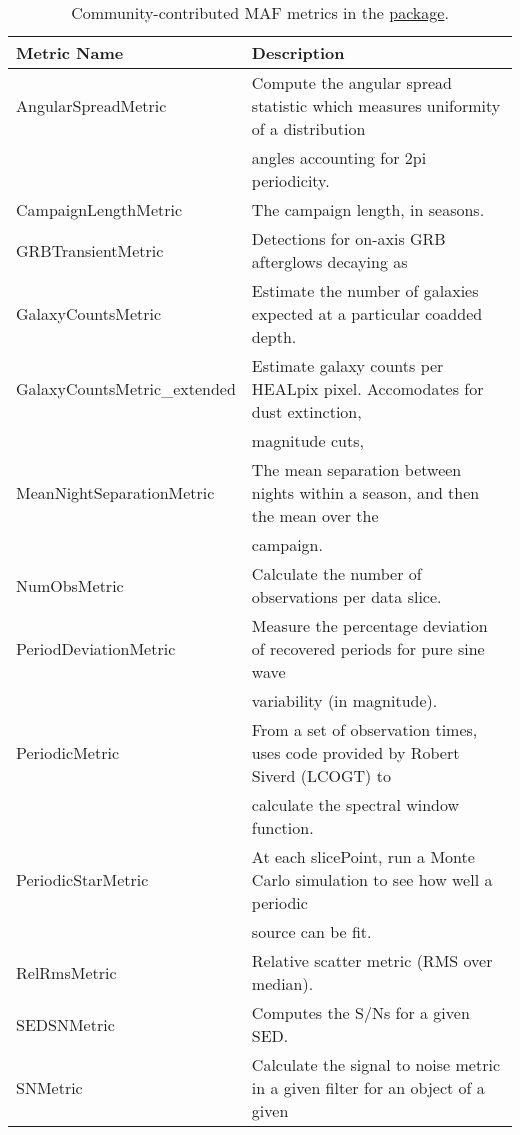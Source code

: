 \begin{table}[!t]
\scriptsize
\setcounter{table}{1}
\makeatletter
\renewcommand{\thetable}{A.\arabic{table}}
\caption{Community-contributed MAF metrics in the \href{https://github.com/LSST-nonproject/sims\_maf\_contrib/tree/master/mafContrib}{  package}.\label{tab:contrib_metrics}}
\medskip
\begin{tabular}{ll}
\hline
                 Metric Name &                                                                       Description \\
\hline\hline
 AngularSpreadMetric &  Compute the angular spread statistic which measures uniformity of a distribution \\
  &  angles accounting for 2pi periodicity. \\
 CampaignLengthMetric &  The campaign length, in seasons. \\
 GRBTransientMetric &  Detections for on-axis GRB afterglows decaying as \\
 GalaxyCountsMetric &  Estimate the number of galaxies expected at a particular coadded depth. \\
 GalaxyCountsMetric\_extended &  Estimate galaxy counts per HEALpix pixel. Accomodates for dust extinction, \\
  &  magnitude cuts, \\
 MeanNightSeparationMetric &  The mean separation between nights within a season, and then the mean over the \\
  &  campaign. \\
 NumObsMetric &  Calculate the number of observations per data slice. \\
 PeriodDeviationMetric &  Measure the percentage deviation of recovered periods for pure sine wave \\
  &  variability (in magnitude). \\
 PeriodicMetric &  From a set of observation times, uses code provided by Robert Siverd (LCOGT) to \\
  &  calculate the spectral window function. \\
 PeriodicStarMetric &  At each slicePoint, run a Monte Carlo simulation to see how well a periodic \\
  &  source can be fit. \\
 RelRmsMetric &  Relative scatter metric (RMS over median). \\
 SEDSNMetric &  Computes the S/Ns for a given SED. \\
 SNMetric &  Calculate the signal to noise metric in a given filter for an object of a given \\

\end{tabular}
\end{table}
